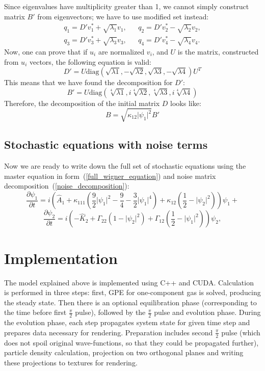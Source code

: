 \documentclass[12pt,notitlepage]{report}
\begin{document}
Since eigenvalues have multiplicity greater than 1, we cannot simply construct matrix $B'$ from eigenvectors;
we have to use modified set instead:
\begin{align*}
q_1 = D' v_1^* + \sqrt{\lambda_1} v_1, & &
q_2 = D' v_2^* - \sqrt{\lambda_2} v_2, \\
q_3 = D' v_3^* + \sqrt{\lambda_3} v_3, & &
q_4 = D' v_4^* - \sqrt{\lambda_4} v_4.
\end{align*}
Now, one can prove that if $u_i$ are normalized $v_i$, and $U$ is the matrix, constructed from $u_i$ vectors,
the following equation is valid:
\[ D' = U \textrm{diag} \left( \sqrt{\lambda{1}}, -\sqrt{\lambda{2}}, \sqrt{\lambda{3}}, -\sqrt{\lambda{4}} \right) U^T \]
This means that we have found the decomposition for $D'$:
\[ B' = U \textrm{diag} \left( \sqrt[4]{\lambda{1}}, i \sqrt[4]{\lambda{2}}, \sqrt[4]{\lambda{3}}, i \sqrt[4]{\lambda{4}} \right) \]
Therefore, the decomposition of the initial matrix $D$ looks like:
\begin{equation}
\label{noise_decomposition}
B = \sqrt{\kappa_{12} \lvert \psi_1 \rvert^2} B'
\end{equation}

\subsection*{Stochastic equations with noise terms}

Now we are ready to write down the full set of stochastic equations using the master equation in form~(\ref{full_wigner_equation})
and noise matrix decomposition~(\ref{noise_decomposition}):
\[
\frac{\partial \psi_1}{\partial t} = i \left( \hat{A}_1 +
\kappa_{111} \left( \frac{9}{2} \lvert \psi_1 \rvert^2 - \frac{9}{4} - \frac{3}{2} \lvert \psi_1 \rvert^4 \right) +
\kappa_{12} \left( \frac{1}{2} - \lvert \psi_2 \rvert^2 \right) \right) \psi_1 +
\]
\[
\frac{\partial \psi_2}{\partial t} = i \left( - \hat{K}_2 + \Gamma_{22} \left( 1 - \lvert \psi_2 \rvert^2 \right) +
\Gamma_{12} \left( \frac{1}{2} - \lvert \psi_1 \rvert^2 \right) \right) \psi_2,
\]

\section*{Implementation}

The model explained above is implemented using C++ and CUDA.
Calculation is performed in three steps: first, GPE for one-component gas is solved, producing the steady state.
Then there is an optional equilibration phase (corresponding to the time before first $\frac{\pi}{2}$ pulse),
followed by the $\frac{\pi}{2}$ pulse and evolution phase.
During the evolution phase, each step propagates system state for given time step and prepares data necessary for rendering.
Preparation includes second $\frac{\pi}{2}$ pulse
(which does not spoil original wave-functions, so that they could be propagated further),
particle density calculation, projection on two orthogonal planes and writing these projections to textures for rendering.
\end{document}
